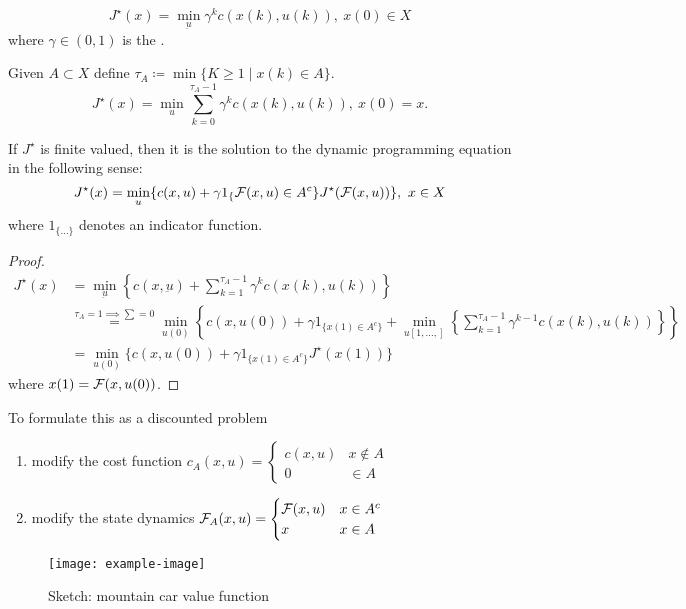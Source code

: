 \[J^\star(x)=\min_{\underbar{u}}\gamma^kc(x(k),u(k)),\ x(0)\in X\]
where \(\gamma\in (0,1)\) is the .


Given \(A\subset X\) define \(\tau_A\coloneqq \min\{K\geq 1\mid x(k)\in A\}\).
\[J^\star(x)=\min_u\sum_{k=0}^{\tau_A-1}\gamma^kc(x(k),u(k)),\ x(0)=x.\]
\begin{proposition}\label{prop:1.18}
    If \(J^\star\) is finite valued, then it is the solution to 
    the dynamic programming equation in the following sense:
    \[J^\star(x)=\min_{u}\{c(x,u)+\gamma1_\{\mathcal{F}(x,u)\in A^c\}J^\star(\mathcal{F}(x,u))\},\ x\in X\]
    where \(1_{\{\dots\}}\) denotes an indicator function.
\end{proposition}
\begin{proof}
    \begin{align*}
        J^\star(x)&=\min_{\underbar{u}}\left\{c(x,\underbar{u})+\sum_{k=1}^{\tau_A-1}\gamma^kc(x(k),u(k))\right\}    \\
        &\stackrel{\tau_A=1\implies\sum=0}{=}\min_{u(0)}\left\{c(x,u(0))+\gamma1_{\{x(1)\in A^c\}}+\min_{u[1,\dots,]}\left\{\sum_{k=1}^{\tau_A-1}\gamma^{k-1}c(x(k),u(k))\right\}\right\}\\
        &=\min_{u(0)}\{c(x,u(0))+\gamma1_{\{x(1)\in A^c\}}J^\star(x(1))\}
    \end{align*}
    where \(x(1)=\mathcal{F}(x,u(0))\).
\end{proof}

To formulate this as a discounted problem 
\begin{enumerate}
    \item modify the cost function \(c_A(x,u)=\begin{cases}
        c(x,u) & x\notin A \\
        0 & \in A 
    \end{cases}\)
    \item modify the state dynamics \(\mathcal{F}_A(x,u)=\begin{cases}
        \mathcal{F}(x,u) & x\in A^c \\
        x & x\in A
    \end{cases}\) 
\end{enumerate}

\begin{figure}[H]\label{fig:1.07}
    \centering
    \texttt{[image: example-image]}
    \caption{Sketch: mountain car value function}
\end{figure}

